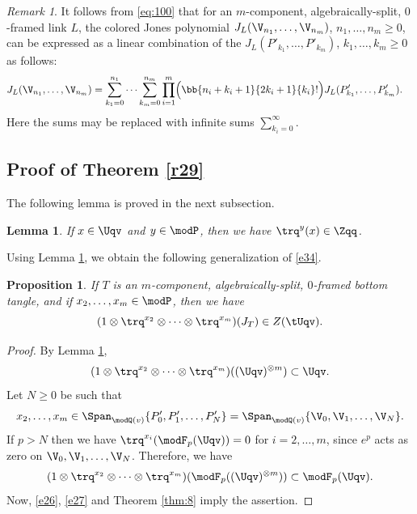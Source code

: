 \documentclass{amsart}
\numberwithin{equation}{section}
\numberwithin{figure}{section}
\theoremstyle{plain}
\newtheorem{lemma}[theorem]{Lemma}
\newtheorem{proposition}[theorem]{Proposition}
\theoremstyle{definition}
\theoremstyle{remark}
\newtheorem{remark}[theorem]{Remark}
\begin{document}
\begin{remark}
  \label{r30}
  It follows from \eqref{eq:100} that for an $m$-component,
  algebraically-split, $0$-framed link $L$, the colored Jones
  polynomial $J_L(\V_{n_1},\ldots,\V_{n_m})$, $n_1,\ldots,n_m\ge 0$, can be
  expressed as a linear combination of the
  $J_L(P'_{k_1},\ldots,P'_{k_m})$, $k_1,\ldots,k_m\ge 0$ as follows:
  \begin{equation}
    \label{e37}
    \begin{split}
      &J_L(\V_{n_1},\ldots,\V_{n_m})
      =\sum_{k_1=0}^{n_1}\cdots\sum_{k_m=0}^{n_m}
      \prod_{i=1}^m\Bigl(\bb{n_i+k_i+1}{2k_i+1}\{k_i\}!\Bigr)
      J_L(P'_{k_1},\ldots,P'_{k_m}).
    \end{split}
  \end{equation}
  Here the sums may be replaced with infinite sums $\sum_{k_i=0}^\infty $.
\end{remark}

\subsection{Proof of Theorem \ref{r29}}
\label{sec:proof-theorem-refr29}

The following lemma is proved in the next subsection.

\begin{lemma}
  \label{thm:63}
  If $x\in \Uqv$ and $y\in \modP $, then we have $\trq^y(x)\in \Zqq$.
\end{lemma}

Using Lemma \ref{thm:63}, we obtain the following generalization of
\eqref{e34}.

\begin{proposition}
  \label{r25}
  If $T$ is an $m$-component, algebraically-split, $0$-framed bottom
  tangle, and if $x_2,\ldots,x_m\in \modP $, then we have
  \begin{equation*}
    (1\otimes \trq^{x_2}\otimes \cdots\otimes \trq^{x_m})(J_T)\in Z(\tUqv).
  \end{equation*}
\end{proposition}

\begin{proof}
  By Lemma \ref{thm:63},
  \begin{equation}
    \label{e26}
    (1\otimes \trq^{x_2}\otimes \cdots\otimes \trq^{x_m})((\Uqv)^{\otimes m})\subset \Uqv.
  \end{equation}
  Let $N\ge 0$ be such that
  \begin{equation}
    x_2,\ldots,x_m
    \in \Span_{\modQ (v)}\{P'_0,P'_1,\ldots,P'_N\}
    =\Span_{\modQ (v)}\{\V_0,\V_1,\ldots,\V_N\}.
  \end{equation}
  If $p>N$ then we have $\trq^{x_i}(\modF _p(\Uqv))=0$ for $i=2,\ldots,m$,
  since $e^p$ acts as zero on $\V_0,\V_1,\ldots,\V_N$.  Therefore, we have
  \begin{equation}
    \label{e27}
    (1\otimes \trq^{x_2}\otimes \cdots\otimes \trq^{x_m})(\modF _p((\Uqv)^{\otimes m}))
    \subset \modF _p(\Uqv).
  \end{equation}
  Now, \eqref{e26}, \eqref{e27} and Theorem \ref{thm:8} imply the
  assertion.
\end{proof}
\end{document}

